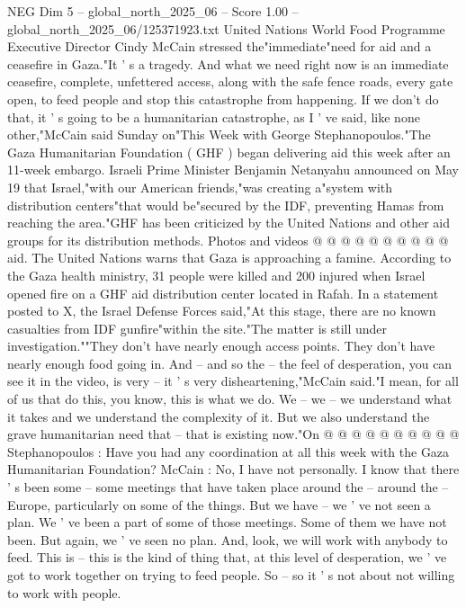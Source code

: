 \begin{textsample}{NEG Dim 5 – global\_north\_2025\_06 – Score 1.00 – global\_north\_2025\_06/125371923.txt}  \label{ex:f5_neg_374}
United Nations World Food Programme Executive Director Cindy McCain stressed the"immediate"need for aid and a ceasefire in Gaza."It ' s a tragedy.
And what we need right now is an immediate ceasefire, complete, unfettered access, along with the safe fence roads, every gate open, to feed people and stop this catastrophe from happening.
If we don't do that, it ' s going to be a humanitarian catastrophe, as I ' ve said, like none other,"McCain said Sunday on"This Week with George Stephanopoulos."The Gaza Humanitarian Foundation ( GHF ) began delivering aid this week after an 11-week embargo.
Israeli Prime Minister Benjamin Netanyahu announced on May 19 that Israel,"with our American friends,"was creating a"system with distribution centers"that would be"secured by the IDF, preventing Hamas from reaching the area."GHF has been criticized by the United Nations and other aid groups for its distribution methods.
Photos and videos @ @ @ @ @ @ @ @ @ @ aid.
The United Nations warns that Gaza is approaching a famine.
According to the Gaza health ministry, 31 people were killed and 200 injured when Israel opened fire on a GHF aid distribution center located in Rafah.
In a statement posted to X, the Israel Defense Forces said,"At this stage, there are no known casualties from IDF gunfire"within the site."The matter is still under investigation.""They don't have nearly enough access points.
They don't have nearly enough food going in.
And -- and so the -- the feel of desperation, you can see it in the video, is very -- it ' s very disheartening,"McCain said."I mean, for all of us that do this, you know, this is what we do.
We -- we -- we understand what it takes and we understand the complexity of it.
But we also understand the grave humanitarian need that -- that is existing now."On @ @ @ @ @ @ @ @ @ @ Stephanopoulos : Have you had any coordination at all this week with the Gaza Humanitarian Foundation?
McCain : No, I have not personally.
I know that there ' s been some -- some meetings that have taken place around the -- around the -- Europe, particularly on some of the things.
But we have -- we ' ve not seen a plan.
We ' ve been a part of some of those meetings.
Some of them we have not been.
But again, we ' ve seen no plan.
And, look, we will work with anybody to feed.
This is -- this is the kind of thing that, at this level of desperation, we ' ve got to work together on trying to feed people.
So -- so it ' s not about not willing to work with people.

\end{textsample}
